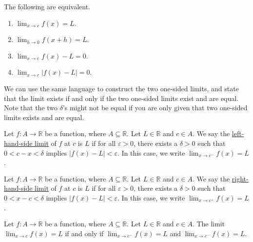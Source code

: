 \documentclass[11pt]{book}
\theoremstyle{break}
\theoremstyle{no_label}
\newcommand{\bbR}{\mathbb{R}}
\numberwithin{equation}{section}
\begin{document}
\begin{theorem}
    The following are equivalent.
    \vspace{-1.2em}
    \begin{multicols}{2}
        \begin{enumerate}
            \item $\displaystyle\lim_{x\to c}f(x)=L$.
            \item $\displaystyle\lim_{h\to 0}f(x+h)=L$.
            \item $\displaystyle\lim_{x\to c}f(x)-L=0$.
            \item $\displaystyle\lim_{x\to c}|f(x)-L|=0$.
        \end{enumerate}
    \end{multicols}
    \vspace{0.01em}
\end{theorem}

We can use the same language to construct the two one-sided limits, and state that the limit exists if and only if the two one-sided limits exist and are equal. Note that the two $\delta$'s might not be equal if you are only given that two one-sided limits exists and are equal.

\begin{definition}
    Let $f:A\to\bbR$ be a function, where $A\subseteq\bbR$. Let $L\in\bbR$ and $c\in A$. We say the \underline{left-hand-side limit} of $f$ at $c$ is $L$ if for all $\varepsilon>0$, there exists a $\delta>0$ such that $0<c-x<\delta$ implies $|f(x)-L|<\varepsilon$. In this case, we write $\displaystyle\lim_{x\to c^-}f(x)=L$.
\end{definition}

\begin{definition}
    Let $f:A\to\bbR$ be a function, where $A\subseteq\bbR$. Let $L\in\bbR$ and $c\in A$. We say the \underline{right-hand-side limit} of $f$ at $c$ is $L$ if for all $\varepsilon>0$, there exists a $\delta>0$ such that $0<x-c<\delta$ implies $|f(x)-L|<\varepsilon$. In this case, we write $\displaystyle\lim_{x\to c^+}f(x)=L$.
\end{definition}

\begin{theorem}
    Let $f:A\to\bbR$ be a function, where $A\subseteq\bbR$. Let $L\in\bbR$ and $c\in A$. The limit $\displaystyle\lim_{x\to c}f(x)=L$ if and only if $\displaystyle\lim_{x\to c^-}f(x)=L$ and $\displaystyle\lim_{x\to c^-}f(x)=L$.
\end{theorem}
\end{document}
